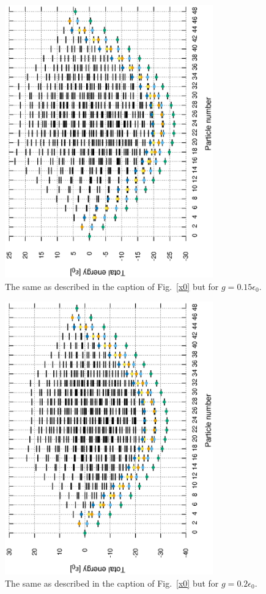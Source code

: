 \documentclass[11pt]{book} %
\begin{document}
\begin{figure}[htbp]
 \begin{center}
  \includegraphics[width=90mm,angle=-90]{images/spectra_g0p15.eps}
 \end{center}
 \caption{The same as described in the caption of Fig.~\ref{x0} but for $g=0.15\epsilon_0$.
	}
 \label{g0p15}
\end{figure}

\begin{figure}[htbp]
 \begin{center}
  \includegraphics[width=90mm,angle=-90]{images/spectra_g0p2.eps}
 \end{center}
 \caption{The same as described in the caption of Fig.~\ref{x0} but for $g=0.2\epsilon_0$.
	}
 \label{g0p2}
\end{figure}



\end{document}
